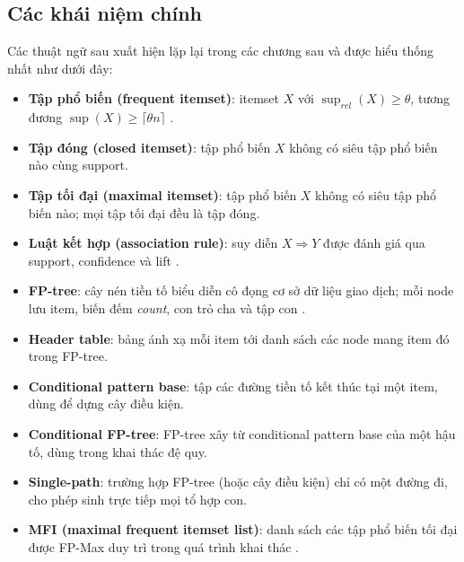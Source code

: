 \subsection{Các khái niệm chính}

Các thuật ngữ sau xuất hiện lặp lại trong các chương sau và được hiểu thống nhất như dưới đây:

\begin{itemize}
    \item \textbf{Tập phổ biến (frequent itemset)}: itemset $X$ với $\operatorname{sup}_{rel}(X) \geq \theta$, tương đương $\operatorname{sup}(X) \geq \lceil \theta n \rceil$ \cite{Agrawal1993AssociationRules}.
    \item \textbf{Tập đóng (closed itemset)}: tập phổ biến $X$ không có siêu tập phổ biến nào cùng support.
    \item \textbf{Tập tối đại (maximal itemset)}: tập phổ biến $X$ không có siêu tập phổ biến nào; mọi tập tối đại đều là tập đóng.
    \item \textbf{Luật kết hợp (association rule)}: suy diễn $X \Rightarrow Y$ được đánh giá qua support, confidence và lift \cite{Agrawal1993AssociationRules}.
    \item \textbf{FP-tree}: cây nén tiền tố biểu diễn cô đọng cơ sở dữ liệu giao dịch; mỗi node lưu item, biến đếm \textit{count}, con trỏ cha và tập con \cite{Han2000FPGrowth}.
    \item \textbf{Header table}: bảng ánh xạ mỗi item tới danh sách các node mang item đó trong FP-tree.
    \item \textbf{Conditional pattern base}: tập các đường tiền tố kết thúc tại một item, dùng để dựng cây điều kiện.
    \item \textbf{Conditional FP-tree}: FP-tree xây từ conditional pattern base của một hậu tố, dùng trong khai thác đệ quy.
    \item \textbf{Single-path}: trường hợp FP-tree (hoặc cây điều kiện) chỉ có một đường đi, cho phép sinh trực tiếp mọi tổ hợp con.
    \item \textbf{MFI (maximal frequent itemset list)}: danh sách các tập phổ biến tối đại được FP-Max duy trì trong quá trình khai thác \cite{Grahne2003FPMax}.
\end{itemize}
